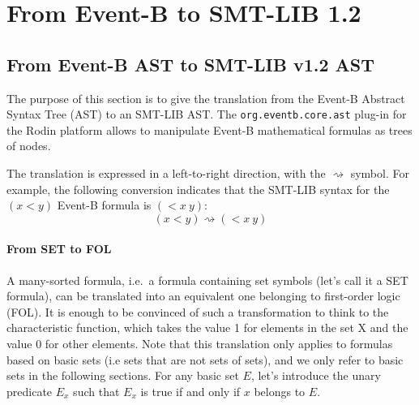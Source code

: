 \section{From Event-B to SMT-LIB 1.2}
\subsection{From Event-B AST to SMT-LIB v1.2 AST}
The purpose of this section is to give the translation from the Event-B Abstract Syntax Tree (AST) to an SMT-LIB AST.
The \texttt{org.eventb.core.ast} plug-in for the Rodin platform allows to manipulate Event-B mathematical formulas as trees of nodes. 

The translation is expressed in a left-to-right direction, with the $\rightsquigarrow$ symbol. For example, the following conversion indicates that the
SMT-LIB syntax for the $(x < y)$ Event-B formula is $(< x~y)$:\[ (x < y) \rightsquigarrow (< x~y) \]

\paragraph{From SET to FOL}
A many-sorted formula, i.e.\ a formula containing set symbols (let's call it a SET formula), can be translated into an equivalent one belonging to first-order logic (FOL). It is enough to be convinced of such a transformation to think to the characteristic function, which takes the value 1 for elements in the set X and the value 0 for other elements. 
Note that this translation only applies to formulas based on basic sets (i.e sets that are not sets of sets), and we only refer to basic sets in the following sections. For any basic set $E$, let's introduce the unary predicate $E_x$ such that $E_x$ is true if and only if $x$ belongs to $E$.

